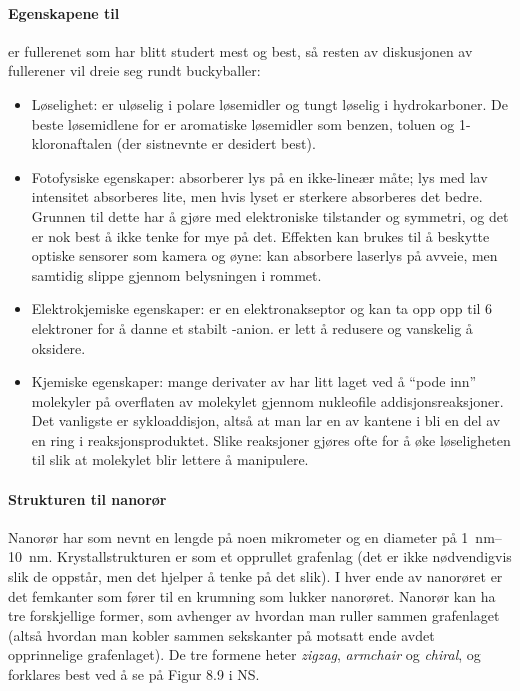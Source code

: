 \paragraph{Egenskapene til }  er fullerenet som har blitt studert mest og best, så resten av diskusjonen av fullerener vil dreie seg rundt buckyballer:
\begin{itemize}
	\item Løselighet:  er uløselig i polare løsemidler og tungt løselig i hydrokarboner. De beste løsemidlene for  er aromatiske løsemidler som benzen, toluen og 1-kloronaftalen (der sistnevnte er desidert best).
	\item Fotofysiske egenskaper:  absorberer lys på en ikke-lineær måte; lys med lav intensitet absorberes lite, men hvis lyset er sterkere absorberes det bedre. Grunnen til dette har å gjøre med elektroniske tilstander og symmetri, og det er nok best å ikke tenke for mye på det. Effekten kan brukes til å beskytte optiske sensorer som kamera og øyne:  kan absorbere laserlys på avveie, men samtidig slippe gjennom belysningen i rommet.
	\item Elektrokjemiske egenskaper:  er en elektronakseptor og kan ta opp opp til 6 elektroner for å danne et stabilt -anion.  er lett å redusere og vanskelig å oksidere.
	\item Kjemiske egenskaper: mange derivater av  har litt laget ved å ``pode inn'' molekyler på overflaten av molekylet gjennom nukleofile addisjonsreaksjoner. Det vanligste er sykloaddisjon, altså at man lar en av kantene i  bli en del av en ring i reaksjonsproduktet. Slike reaksjoner gjøres ofte for å øke løseligheten til  slik at molekylet blir lettere å manipulere.
\end{itemize}

\paragraph{Strukturen til nanorør} Nanorør har som nevnt en lengde på noen mikrometer og en diameter på \SIrange{1}{10}{\nano\meter}. Krystallstrukturen er som et opprullet grafenlag (det er ikke nødvendigvis slik de oppstår, men det hjelper å tenke på det slik). I hver ende av nanorøret er det femkanter som fører til en krumning som lukker nanorøret. Nanorør kan ha tre forskjellige former, som avhenger av hvordan man ruller sammen grafenlaget (altså hvordan man kobler sammen sekskanter på motsatt ende avdet opprinnelige grafenlaget). De tre formene heter \emph{zigzag}, \emph{armchair} og \emph{chiral}, og forklares best ved å se på Figur 8.9 i NS.

